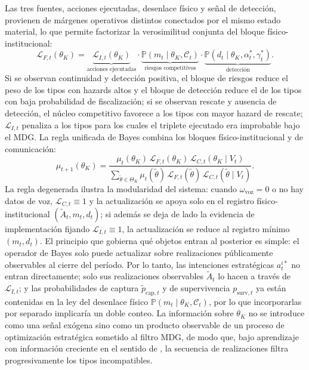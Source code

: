 \documentclass[pdflatex,sn-mathphys-ay]{sn-jnl}
\theoremstyle{thmstyleone}
\theoremstyle{thmstyletwo}
\theoremstyle{thmstylethree}
\newcommand{\Prob}{\mathbb{P}}
\newcommand{\ThetaK}{\Theta_K}
\newcommand{\1}{\mathbf{1}}
\begin{document}
Las tres fuentes, acciones ejecutadas, desenlace físico y señal de detección, provienen de márgenes operativos distintos conectados por el mismo estado material, lo que permite factorizar la verosimilitud conjunta del bloque físico-institucional:
\begin{equation}
\mathcal{L}_{F,t}(\theta_K)=\underbrace{\mathcal{L}_{I,t}(\theta_K)}_{\text{acciones ejecutadas}}\cdot\underbrace{\Prob(m_t\mid\theta_K,\mathcal{C}_t)}_{\text{riesgos competitivos}}\cdot\underbrace{\Prob(d_t\mid\theta_K,\alpha_t^\ast,\gamma_t^\ast)}_{\text{detección}}.
\label{eq:LF-joint}
\end{equation}
Si se observan continuidad y detección positiva, el bloque de riesgos reduce el peso de los tipos con hazards altos y el bloque de detección reduce el de los tipos con baja probabilidad de fiscalización; si se observan rescate y ausencia de detección, el núcleo competitivo favorece a los tipos con mayor hazard de rescate; $\mathcal{L}_{I,t}$ penaliza a los tipos para los cuales el triplete ejecutado era improbable bajo el MDG. La regla unificada de Bayes combina los bloques físico-institucional y de comunicación:
\begin{equation}
\mu_{t+1}(\theta_K)=\frac{\mu_t(\theta_K)\,\mathcal{L}_{F,t}(\theta_K)\,\mathcal{L}_{C,t}(\theta_K\mid V_t)}{\sum_{\tilde\theta\in\ThetaK}\mu_t(\tilde\theta)\,\mathcal{L}_{F,t}(\tilde\theta)\,\mathcal{L}_{C,t}(\tilde\theta\mid V_t)}.
\label{eq:bayes-update}
\end{equation}
La regla degenerada ilustra la modularidad del sistema: cuando $\omega_{\mathrm{voz}}=0$ o no hay datos de voz, $\mathcal{L}_{C,t}\equiv 1$ y la actualización se apoya solo en el registro físico-institucional $(\tilde{A}_t,m_t,d_t)$; si además se deja de lado la evidencia de implementación fijando $\mathcal{L}_{I,t}\equiv 1$, la actualización se reduce al registro mínimo $(m_t,d_t)$. El principio que gobierna qué objetos entran al posterior es simple: el operador de Bayes solo puede actualizar sobre realizaciones públicamente observables al cierre del período. Por lo tanto, las intenciones estratégicas $a_t^{i\ast}$ no entran directamente; solo sus realizaciones observables $\tilde{A}_t$ lo hacen a través de $\mathcal{L}_{I,t}$; y las probabilidades de captura $\tilde{p}_{\mathrm{cap},t}$ y de supervivencia $p_{\mathrm{surv},t}$ ya están contenidas en la ley del desenlace físico $\Prob(m_t\mid\theta_K,\mathcal{C}_t)$, por lo que incorporarlas por separado implicaría un doble conteo. La información sobre $\theta_K$ no se introduce como una señal exógena sino como un producto observable de un proceso de optimización estratégica sometido al filtro MDG, de modo que, bajo aprendizaje con información creciente en el sentido de \citet{BlackwellDubins1962}, la secuencia de realizaciones filtra progresivamente los tipos incompatibles.
\end{document}
